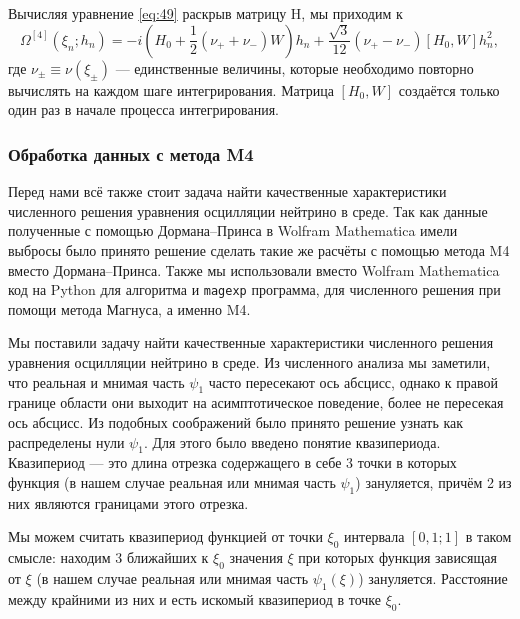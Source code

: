 \documentclass[a4paper,12pt]{article}
\begin{document}
	Вычисляя уравнение \eqref{eq:49} раскрыв матрицу H,  мы приходим к
	\begin{equation}
		\Omega^{[4]}(\xi_n;h_n)=-i(H_0 + \frac{1}{2}(\nu_+ + \nu_-)W)h_n +
\frac{\sqrt{3}}{12}(\nu_+ - \nu_-)[H_0, W]h_n^2,
	\end{equation}
	где \(\nu_{\pm} \equiv \nu(\xi_{\pm})\) --- единственные величины, которые необходимо повторно вычислять на каждом шаге интегрирования. Матрица \([H_0,W]\) создаётся только один раз в начале процесса интегрирования.

\subsubsection{Обработка данных с метода M4}

	Перед нами всё также стоит задача найти качественные характеристики численного решения уравнения осцилляции нейтрино в среде. Так как данные полученные с помощью Дормана--Принса в \textsf{Wolfram Mathematica} имели выбросы было принято решение сделать такие же расчёты с помощью метода M4 вместо Дормана--Принса. Также мы использовали вместо \textsf{Wolfram Mathematica} код на \textsf{Python} для алгоритма и \texttt{magexp} программа, для численного решения при помощи метода Магнуса, а именно M4.

Мы поставили задачу найти качественные характеристики численного решения уравнения осцилляции нейтрино в среде. Из численного анализа мы заметили, что реальная и мнимая часть \(\psi_1\) часто пересекают ось абсцисс, однако к правой границе области они выходит на асимптотическое поведение, более не пересекая ось абсцисс. Из подобных соображений было принято решение узнать как распределены нули \(\psi_{1}\). Для этого было введено понятие квазипериода. Квазипериод --- это длина отрезка содержащего в себе 3 точки в которых функция  (в нашем случае реальная или мнимая часть \(\psi_1\)) зануляется, причём 2 из них являются границами этого отрезка.

Мы можем считать квазипериод функцией от точки \(\xi_0\) интервала \([0,1 ; 1]\) в таком смысле: находим 3 ближайших к \(\xi_0\) значения \(\xi\) при которых функция зависящая от \(\xi\) (в нашем случае реальная или мнимая часть \(\psi_1(\xi)\)) зануляется. Расстояние между крайними из них и есть искомый квазипериод в точке \(\xi_0\).
\end{document}
